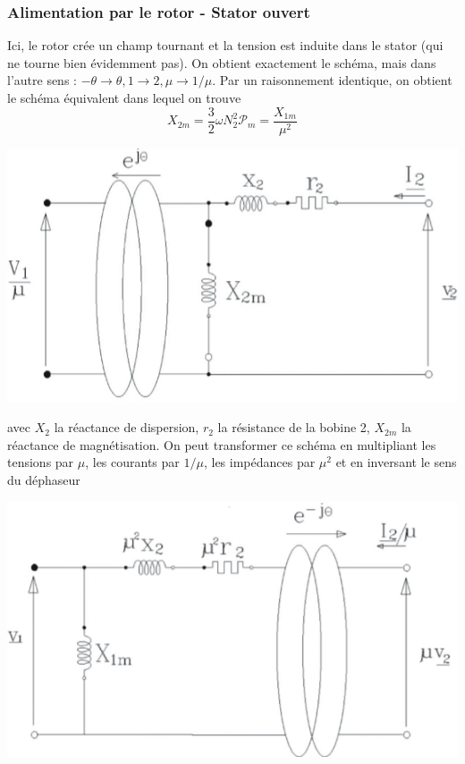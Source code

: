 		
		
		\subsubsection{Alimentation par le rotor - Stator ouvert}		
		Ici, le rotor crée un champ tournant et la tension est induite dans le 
		stator (qui ne tourne bien évidemment pas). On obtient exactement le 
		schéma, mais dans l'autre sens : $-\theta\rightarrow\theta, 1\rightarrow 2,
		\mu \rightarrow 1/\mu$. Par un raisonnement identique, on obtient le 
		schéma équivalent dans lequel on trouve
		\begin{equation}
		X_{2m} = \frac{3}{2}\omega N_2^2\mathcal{P}_m = \dfrac{X_{1m}}{\mu^2}
		\end{equation}
		\begin{center}
		\includegraphics[scale=0.5]{ch5/image19.png}
		\end{center}
		avec $X_2$ la réactance de dispersion, $r_2$ la résistance de la bobine 2, 
		$X_{2m}$ la réactance de magnétisation. On peut transformer ce schéma en 
		multipliant les tensions par $\mu$, les courants par $1/\mu$, les impédances 
		par $\mu^2$ et en inversant le sens du déphaseur
		\begin{center}
		\includegraphics[scale=0.5]{ch5/image20.png}
		\end{center}		
		
